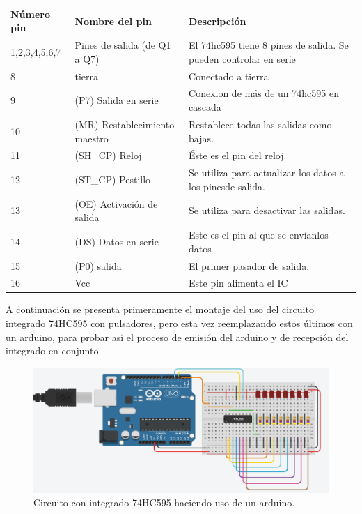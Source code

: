 \documentclass{article}
\begin{document}
\begin{itemize}
\begin{table}
\centering
\begin{tabular}{lll}
\textbf{Número pin} & \textbf{Nombre del pin}       & \textbf{Descripción}                                              \\
1,2,3,4,5,6,7       & Pines de salida (de Q1 a Q7)  & El 74hc595 tiene 8 pines de salida. Se pueden controlar en serie  \\
8                   & tierra                        & Conectado a tierra                                                \\
9                   & (P7) Salida en serie          & Conexion de más de un 74hc595 en cascada                          \\
10                  & (MR) Restablecimiento maestro & Restablece todas las salidas como bajas.                          \\
11                  & (SH\_CP) Reloj                & Éste es el pin del reloj                                          \\
12                  & (ST\_CP) Pestillo             & Se utiliza para actualizar los datos a los pinesde salida.        \\
13                  & (OE) Activación de salida     & Se utiliza para desactivar las salidas.                           \\
14                  & (DS) Datos en serie           & Este es el pin al que se envíanlos datos                          \\
15                  & (P0) salida                   & El primer pasador de salida.                                      \\
16                  & Vcc                           & Este pin alimenta el IC                                          
\end{tabular}
\end{table}

\newline

 A continuación se presenta primeramente el montaje del uso del circuito integrado 74HC595 con pulsadores, pero esta vez reemplazando estos últimos con un arduino, para probar así el proceso de emisión del arduino y de recepción del integrado en conjunto.

\begin{figure}[h]
\includegraphics[scale=0.4]{prueba arduino integrado.png}
\centering
\caption{Circuito con integrado 74HC595 haciendo uso de un arduino.}
\label{fig:reemplazo pulsador por arduino}
\end{figure}



\end{itemize}
\end{document}
